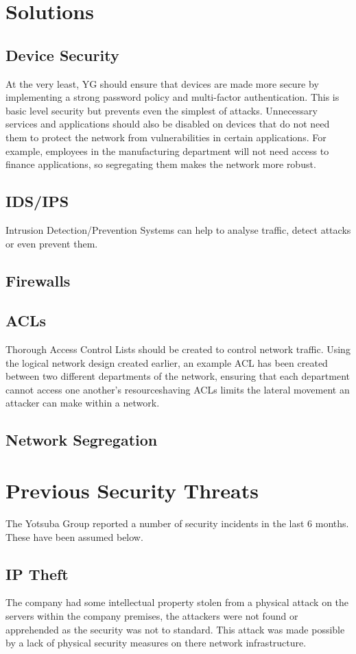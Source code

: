 \section{Solutions}
\subsection{Device Security}
At the very least, YG should ensure that devices are made more secure by implementing a strong password policy and multi-factor authentication. This is basic level security but prevents even the simplest of attacks. Unnecessary services and applications should also be disabled on devices that do not need them to protect the network from vulnerabilities in certain applications. For example, employees in the manufacturing department will not need access to finance applications, so segregating them makes the network more robust.
\subsection{IDS/IPS}
Intrusion Detection/Prevention Systems can help to analyse traffic, detect attacks or even prevent them.
\subsection{Firewalls}
\subsection{ACLs}
Thorough Access Control Lists should be created to control network traffic. Using the logical network design created earlier, an example ACL has been created between two different departments of the network, ensuring that each department cannot access one another’s resourceshaving ACLs limits the lateral movement an attacker can make within a network.
\subsection{Network Segregation}

\section{Previous Security Threats}
The Yotsuba Group reported a number of security incidents in the last 6 months. These have been assumed below.
\subsection{IP Theft}
The company had some intellectual property stolen from a physical attack on the servers within the company premises, the attackers were not found or apprehended as the security was not to standard. This attack was made possible by a lack of physical security measures on there network infrastructure.
